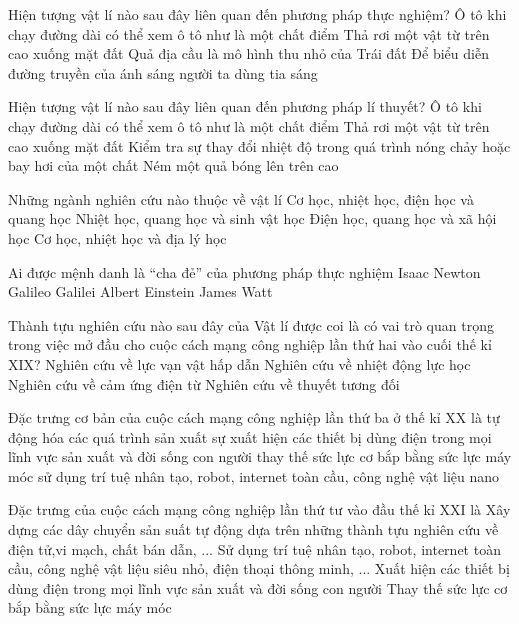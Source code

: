 \begin{ex}
	Hiện tượng vật lí nào sau đây liên quan đến phương pháp thực nghiệm?
	\choice
	{Ô tô khi chạy đường dài có thể xem ô tô như là một chất điểm}
	{\True Thả rơi một vật từ trên cao xuống mặt đất}
	{Quả địa cầu là mô hình thu nhỏ của Trái đất}
	{Để biểu diễn đường truyền của ánh sáng người ta dùng tia sáng}
	\loigiai{}
\end{ex}

\begin{ex}
	Hiện tượng vật lí nào sau đây liên quan đến phương pháp lí thuyết?
	\choice
	{\True Ô tô khi chạy đường dài có thể xem ô tô như là một chất điểm}
	{Thả rơi một vật từ trên cao xuống mặt đất}
	{Kiểm tra sự thay đổi nhiệt độ trong quá trình nóng chảy hoặc bay hơi của một chất}
	{Ném một quả bóng lên trên cao}
	\loigiai{}
\end{ex}

\begin{ex}
	Những ngành nghiên cứu nào thuộc về vật lí
	\choice
	{\True Cơ học, nhiệt học, điện học và quang học}
	{Nhiệt học, quang học và sinh vật học}
	{Điện học, quang học và xã hội học}
	{Cơ học, nhiệt học và địa lý học}
	\loigiai{}
\end{ex}

\begin{ex}
	Ai được mệnh danh là “cha đẻ” của phương pháp thực nghiệm
	\choice
	{Isaac Newton}
	{\True Galileo Galilei}
	{Albert Einstein}
	{James Watt}
	\loigiai{}
\end{ex}

\begin{ex}
	Thành tựu nghiên cứu nào sau đây của Vật lí được coi là có vai trò quan trọng trong việc mở đầu cho cuộc cách mạng công nghiệp lần thứ hai vào cuối thế kỉ XIX?
	\choice
	{Nghiên cứu về lực vạn vật hấp dẫn}
	{Nghiên cứu về nhiệt động lực học}
	{\True Nghiên cứu về cảm ứng điện từ}
	{Nghiên cứu về thuyết tương đối}
	\loigiai{}
\end{ex}

\begin{ex}
	Đặc trưng cơ bản của cuộc cách mạng công nghiệp lần thứ ba ở thế kỉ XX là
	\choice
	{\True tự động hóa các quá trình sản xuất}
	{sự xuất hiện các thiết bị dùng điện trong mọi lĩnh vực sản xuất và đời sống con người}
	{thay thế sức lực cơ bắp bằng sức lực máy móc}
	{sử dụng trí tuệ nhân tạo, robot, internet toàn cầu, công nghệ vật liệu nano}
	\loigiai{}
\end{ex}

\begin{ex}
	Đặc trưng của cuộc cách mạng công nghiệp lần thứ tư vào đầu thế kỉ XXI là
	\choice
	{Xây dựng các dây chuyển sản suất tự động dựa trên những thành tựu nghiên cứu về điện tử,vi mạch, chất bán dẫn, ...}
	{\True Sử dụng trí tuệ nhân tạo, robot, internet toàn cầu, công nghệ vật liệu siêu nhỏ, điện thoại thông minh, ...}
	{Xuất hiện các thiết bị dùng điện trong mọi lĩnh vực sản xuất và đời sống con người}
	{Thay thế sức lực cơ bắp bằng sức lực máy móc}
	\loigiai{}
\end{ex}

